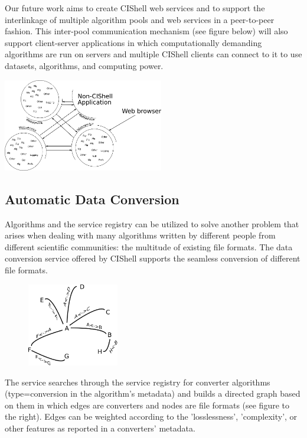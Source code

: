 Our future work aims to create CIShell web services and to support the 
interlinkage of multiple algorithm pools and web services in a peer-to-peer 
fashion. This inter-pool communication mechanism (see figure below) will also 
support client-server applications in which computationally demanding 
algorithms are run on servers and multiple CIShell clients can connect to it to 
use datasets, algorithms, and computing power.

\begin{center}
\includegraphics[width=70mm]{graphics/connectingPools.png}
\end{center}

\subsection{Automatic Data Conversion}

Algorithms and the service registry can be utilized to solve another problem 
that arises when dealing with many algorithms written by different people from 
different scientific communities: the multitude of existing file formats. The 
data conversion service offered by CIShell supports the seamless conversion of 
different file formats.

\begin{figure} 
\includegraphics[width=40mm,clip=true]{graphics/conversionGraph.png}
\end{figure}

The service searches through the service registry for converter algorithms 
(type=conversion in the algorithm's metadata) and builds a directed graph based 
on them in which edges are converters and nodes are file formats (see figure to 
the right). Edges can be weighted according to the 'losslessness', 
'complexity', or other features as reported in a converters' metadata.

